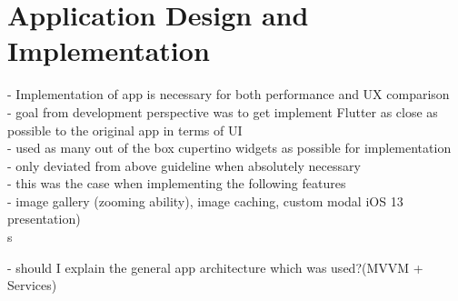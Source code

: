 \chapter{Application Design and Implementation}
- Implementation of app is necessary for both performance and UX comparison\\
- goal from development perspective was to get implement Flutter as close as possible to the original app in terms of UI\\
- used as many out of the box cupertino widgets as possible for implementation\\
- only deviated from above guideline when absolutely necessary\\
- this was the case when implementing the following features\\
- image gallery (zooming ability), image caching, custom modal iOS 13 presentation)\\s

- should I explain the general app architecture which was used?(MVVM + Services)\\

